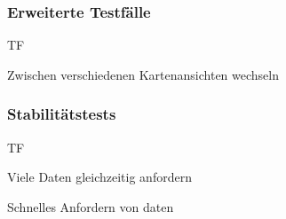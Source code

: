 \subsubsection{Erweiterte Testfälle}
\begin{Kriterien}{TF}
	
	\item Zwischen verschiedenen Kartenansichten wechseln
	
\end{Kriterien}
\subsubsection{Stabilitätstests}
\begin{Kriterien}{TF}

	\item Viele Daten gleichzeitig anfordern

	\item Schnelles Anfordern von daten
	
\end{Kriterien}
